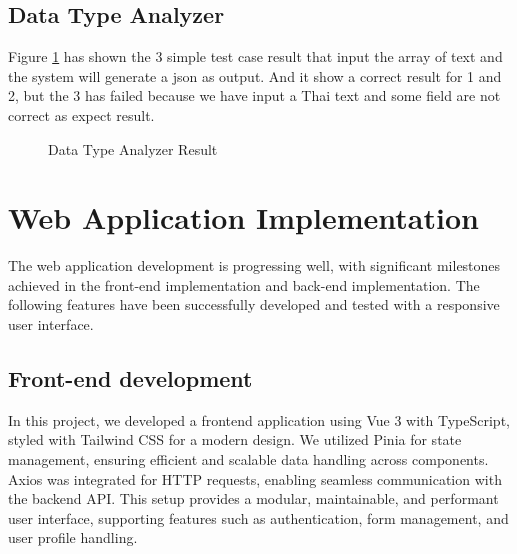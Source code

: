\documentclass[12pt,oneside,openright,a4paper]{cpe-english-project}
\begin{document}
\subsection{Data Type Analyzer}
Figure \ref{fig:datatype-result} has shown the 3 simple test case result that input the array of text and the system will generate a json as output. And it show a correct result for 1 and 2, but the 3 has failed because we have input a Thai text and some field are not correct as expect result.

\begin{figure}[H]
\centering
{}
\caption{Data Type Analyzer Result}\label{fig:datatype-result}
\end{figure}


\section{Web Application Implementation}

The web application development is progressing well, with significant milestones achieved in the front-end implementation and back-end implementation. The following features have been successfully developed and tested with a responsive user interface.

\subsection{Front-end development}

In this project, we developed a frontend application using Vue 3 with TypeScript, styled with Tailwind CSS for a modern design. We utilized Pinia for state management, ensuring efficient and scalable data handling across components. Axios was integrated for HTTP requests, enabling seamless communication with the backend API. This setup provides a modular, maintainable, and performant user interface, supporting features such as authentication, form management, and user profile handling.
\end{document}

